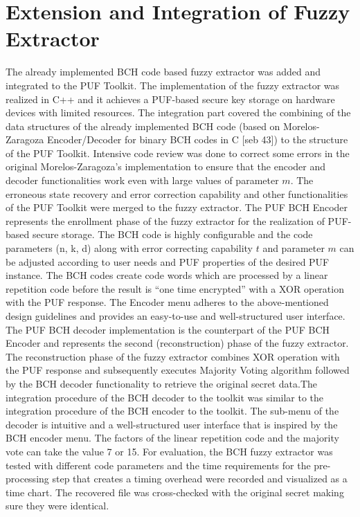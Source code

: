 \section{Extension and Integration of Fuzzy Extractor}
The already implemented BCH code based fuzzy extractor was added and integrated to the PUF Toolkit. The implementation of the fuzzy extractor was realized in C++ and it achieves a PUF-based secure key storage on hardware devices with limited resources. The integration part covered the combining of the data structures of the already implemented BCH code (based on Morelos-Zaragoza Encoder/Decoder for binary BCH codes in C [seb 43]) to the structure of the PUF Toolkit. Intensive code review was
done to correct some errors in the original Morelos-Zaragoza's implementation to ensure that the encoder and decoder functionalities work even with large values of parameter $m$. The erroneous state recovery and error correction capability and other functionalities of the PUF Toolkit were merged to the fuzzy extractor. The PUF BCH Encoder represents the enrollment phase of the fuzzy extractor for the realization of PUF-based secure storage. The BCH code is highly configurable and the code
parameters (n, k, d) along with error correcting capability $t$ and parameter $m$ can be adjusted according to user needs and PUF properties of the desired PUF instance. The BCH codes create code words which are processed by a linear repetition code before the result is ``one time encrypted'' with a XOR operation with the PUF response. The Encoder menu adheres to the above-mentioned design guidelines and provides an easy-to-use and well-structured user interface. The PUF BCH decoder
implementation is the counterpart of the PUF BCH Encoder and represents the second (reconstruction) phase of the fuzzy extractor. The reconstruction phase of the fuzzy extractor combines XOR operation with the PUF response and subsequently executes Majority Voting algorithm followed by the BCH decoder functionality to retrieve the original secret data.The integration procedure of the BCH decoder to the toolkit was similar to the integration procedure of the BCH encoder to the toolkit. The sub-menu of the
decoder is intuitive and a well-structured user interface that is inspired by the BCH encoder menu. The factors of the linear repetition code and the majority vote can take the value 7 or 15. For evaluation, the BCH fuzzy extractor was tested with different code parameters and the time requirements for the pre-processing step that creates a timing overhead were recorded and visualized as a time chart. The recovered file was cross-checked with the original secret making sure they were
identical.\\

